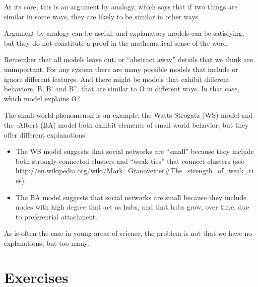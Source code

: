 \documentclass[12pt]{book}
\theoremstyle{exercise}
\begin{document}
At its core, this is an argument by analogy, which says that if two
things are similar in some ways, they are likely to be similar in
other ways.

Argument by analogy can be useful, and explanatory models can be
satisfying, but they do not constitute a proof in the mathematical
sense of the word.

Remember that all models leave out, or ``abstract away''
details that we think are unimportant.  For any system there
are many possible models that include or ignore different features.
And there might be models that exhibit different behaviors,
B, B' and B'', that are similar to O in different ways.
In that case, which model explains O?

The small world phenomenon is an example: the Watts-Strogatz (WS)
model and the \Barabasi-Albert (BA) model both exhibit elements of
small world behavior, but they offer different explanations:

\begin{itemize}

\item The WS model suggests that social networks are ``small'' because
  they include both strongly-connected clusters and ``weak ties'' that
  connect clusters (see \url{http://en.wikipedia.org/wiki/Mark_Granovetter#The_strength_of_weak_ties}).

\item The BA model suggests that social networks are small because
  they include nodes with high degree that act as hubs, and that
  hubs grow, over time, due to preferential attachment.

\end{itemize}

As is often the case in young areas of science, the problem is
not that we have no explanations, but too many.


\section{Exercises}
\end{document}
